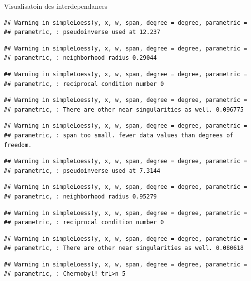 \documentclass[11pt,ignorenonframetext,]{beamer}
\begin{document}
\begin{frame}[fragile]{Visualisatoin des interdependances}
\begin{verbatim}
## Warning in simpleLoess(y, x, w, span, degree = degree, parametric =
## parametric, : pseudoinverse used at 12.237
\end{verbatim}

\begin{verbatim}
## Warning in simpleLoess(y, x, w, span, degree = degree, parametric =
## parametric, : neighborhood radius 0.29044
\end{verbatim}

\begin{verbatim}
## Warning in simpleLoess(y, x, w, span, degree = degree, parametric =
## parametric, : reciprocal condition number 0
\end{verbatim}

\begin{verbatim}
## Warning in simpleLoess(y, x, w, span, degree = degree, parametric =
## parametric, : There are other near singularities as well. 0.096775
\end{verbatim}

\begin{verbatim}
## Warning in simpleLoess(y, x, w, span, degree = degree, parametric =
## parametric, : span too small. fewer data values than degrees of freedom.
\end{verbatim}

\begin{verbatim}
## Warning in simpleLoess(y, x, w, span, degree = degree, parametric =
## parametric, : pseudoinverse used at 7.3144
\end{verbatim}

\begin{verbatim}
## Warning in simpleLoess(y, x, w, span, degree = degree, parametric =
## parametric, : neighborhood radius 0.95279
\end{verbatim}

\begin{verbatim}
## Warning in simpleLoess(y, x, w, span, degree = degree, parametric =
## parametric, : reciprocal condition number 0
\end{verbatim}

\begin{verbatim}
## Warning in simpleLoess(y, x, w, span, degree = degree, parametric =
## parametric, : There are other near singularities as well. 0.080618
\end{verbatim}

\begin{verbatim}
## Warning in simpleLoess(y, x, w, span, degree = degree, parametric =
## parametric, : Chernobyl! trL>n 5


\end{verbatim}
\end{frame}
\end{document}

